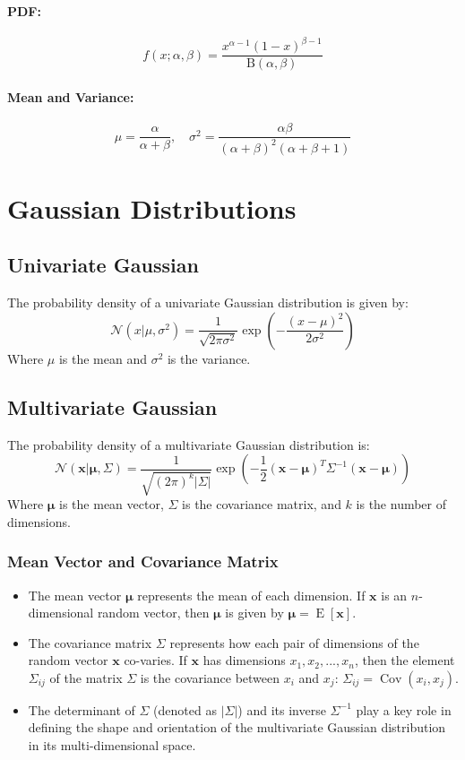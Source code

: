 \documentclass[8pt, a4paper, landscape, includeheadfoot]{extarticle}
\begin{document}
\begin{multicols*}{4}
	\paragraph{PDF:}
	$$
		f(x; \alpha, \beta) = \frac{x^{\alpha - 1} (1 - x)^{\beta - 1}}{\mathrm{B}(\alpha, \beta)}
	$$
	\paragraph{Mean and Variance:}
	$$
		\mu = \frac{\alpha}{\alpha + \beta}, \quad \sigma^2 = \frac{\alpha \beta}{(\alpha + \beta)^2 (\alpha + \beta + 1)}
	$$

	\section{Gaussian Distributions}
	\subsection{Univariate Gaussian}
	The probability density of a univariate Gaussian distribution is given by:
	$$
		\mathcal{N}(x | \mu, \sigma^2) = \frac{1}{\sqrt{2\pi \sigma^2}} \exp\left( -\frac{(x-\mu)^2}{2\sigma^2} \right)
	$$
	Where $\mu$ is the mean and $\sigma^2$ is the variance.

	\subsection{Multivariate Gaussian}
	The probability density of a multivariate Gaussian distribution is:
	$$
		\mathcal{N}(\mathbf{x} | \boldsymbol{\mu}, \Sigma) = \frac{1}{\sqrt{(2\pi)^k |\Sigma|}} \exp\left( -\frac{1}{2} (\mathbf{x} - \boldsymbol{\mu})^T \Sigma^{-1} (\mathbf{x} - \boldsymbol{\mu}) \right)
	$$
	Where $\boldsymbol{\mu}$ is the mean vector, $\Sigma$ is the covariance matrix, and $k$ is the number of dimensions.
	\subsubsection{Mean Vector and Covariance Matrix}{}
	\begin{itemize}
		\item The mean vector \(\boldsymbol{\mu}\) represents the mean of each dimension. If \(\mathbf{x}\) is an \(n\)-dimensional random vector, then \(\boldsymbol{\mu}\) is given by \(\boldsymbol{\mu} = \operatorname{E}[\mathbf{x}]\).
		\item The covariance matrix \(\Sigma\) represents how each pair of dimensions of the random vector \(\mathbf{x}\) co-varies. If \(\mathbf{x}\) has dimensions \(x_1, x_2, ..., x_n\), then the element \(\Sigma_{ij}\) of the matrix \(\Sigma\) is the covariance between \(x_i\) and \(x_j\): \(\Sigma_{ij} = \operatorname{Cov}(x_i, x_j)\).
		\item The determinant of \(\Sigma\) (denoted as \(|\Sigma|\)) and its inverse \(\Sigma^{-1}\) play a key role in defining the shape and orientation of the multivariate Gaussian distribution in its multi-dimensional space.
	\end{itemize}


\end{multicols*}
\end{document}
